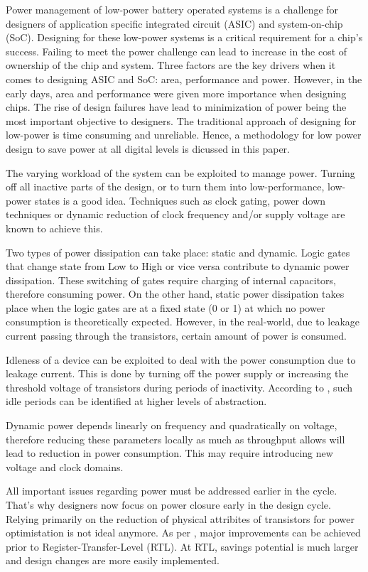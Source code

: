 \documentclass[conference]{IEEEtran}
\begin{document}
Power management of low-power battery operated systems is a challenge for designers of application specific integrated circuit (ASIC) and system-on-chip (SoC). Designing for these low-power systems is a critical requirement for a chip's success. Failing to meet the power challenge can lead to increase in the cost of ownership of the chip and system. Three factors are the key drivers when it comes to designing ASIC and SoC: area, performance and power. However, in the early days, area and performance were given more importance when designing chips. The rise of design failures have lead to minimization of power being the most important objective to designers. The traditional approach of designing for low-power is time consuming and unreliable. Hence, a methodology \cite{Ret} for low power design to save power at all digital levels is dicussed in this paper. 

The varying workload of the system can be exploited to manage power. Turning off all inactive parts of the design, or to turn them into low-performance, low-power states is a good idea. Techniques such as clock gating, power down techniques or dynamic reduction of clock frequency and/or supply voltage are known to achieve this. 

Two types of power dissipation can take place: static and dynamic. Logic gates that change state from Low to High or vice versa contribute to dynamic power dissipation. These switching of gates require charging of internal capacitors, therefore consuming power. On the other hand, static power dissipation takes place when the logic gates are at a fixed state (0 or 1) at which no power consumption is theoretically expected. However, in the real-world, due to leakage current passing through the transistors, certain amount of power is consumed. 

Idleness of a device can be exploited to deal with the power consumption due to leakage current. This is done by turning off the power supply or increasing the threshold voltage of transistors during periods of inactivity. According to \cite{Ret}, such idle periods can be identified at higher levels of abstraction. 

Dynamic power depends linearly on frequency and quadratically on voltage, therefore reducing these parameters locally as much as throughput allows will lead to reduction in power consumption. This may require introducing new voltage and clock domains. 

All important issues regarding power must be addressed earlier in the cycle. That's why designers now focus on power closure early in the design cycle. Relying primarily on the reduction of physical attribites of transistors  for power optimistation is not ideal anymore. As per \cite{Ret}, major improvements can be achieved prior to Register-Transfer-Level (RTL). At RTL, savings potential is much larger and design changes are more easily implemented. 
\end{document}
